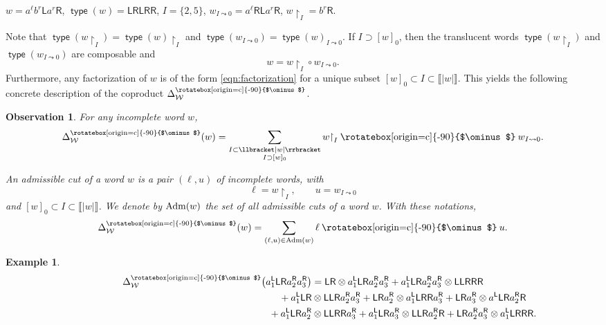 \documentclass[pdftex]{sigma}
\newcommand\overt{\mathbin{\text{\rotatebox[origin=c]{-90}{$\ominus$}}}}
\newcommand{\interval}[1]{\llbracket #1 \rrbracket}
\renewcommand{\restriction}[2]{{#1\mathbin{\upharpoonright}_{#2}}}
\newcommand{\translucidation}[2]{{{#1}_{#2\leadsto0}}}
\newcommand\IWc{\mathcal{W}}
\DeclareMathOperator{\Type}{\mathsf{type}}
\newcommand{\vcp}{\Delta^{\overt}}
\newcommand\vcpS{\vcp_{\IWc}}
\newcommand\LL{{\mathsf{L}}}
\newcommand\RR{{\mathsf{R}}}
\numberwithin{equation}{section}
\newtheorem{Observation}[Theorem]{Observation}
\newtheorem{Example}[Theorem]{Example}
\begin{document}
\begin{example*}
$ w = a^{\ell}b^{r}\LL a^{r} \RR$, $\Type(w)=\LL\RR\LL\RR\RR$, $I=\{2,5\}$, $\translucidation{w}{I}=a^{\ell}\RR\LL a^r\RR$, $\restriction{w}{I} = b^r\RR$.
\end{example*}

Note that $\Type(\restriction{w}{I})=\restriction{\Type(w)}{I}$ and $\Type(\translucidation{w}{I})=\translucidation{\Type(w)}{I}$. If $I\supset [w]_0$, then the translucent words $\Type(\restriction{w}{I})$ and $\Type(\translucidation{w}{I})$ are composable and
\begin{equation}
\label{eqn:factorization}
w=\restriction{w}{I}\circ\translucidation{w}{I}.
\end{equation}
Furthermore, any factorization of $w$ is of the form \eqref{eqn:factorization} for a unique subset $[w]_0\subset I\subset\interval{|w|}$. This yields the following concrete description of the coproduct $\vcpS$.

\begin{Observation} \label{obs:coproduct}
 For any incomplete word $w$,
 \[\vcpS(w)=\sum_{\substack{I \subset \interval{|w|} \\ I\supset{[w]_0}}}{\restriction{w}{I}}\overt{\translucidation{w}{I}}.\]

An {\it admissible cut} of a word $w$ is a pair $(\ell,u)$ of incomplete words, with
\[
\ell = \restriction{w}{I},\qquad u=\translucidation{w}{I}
\]
and $ [w]_{0} \subset I \subset \llbracket |w| \rrbracket$. We denote by ${\rm Adm}(w)$
the set of all admissible cuts of a word $w$. With these notations,
\[
\vcpS(w)=\sum_{(\ell,u) \in {\rm Adm}(w)} \ell \overt u.
\]
\end{Observation}

\begin{Example}
	\begin{gather*}
		\vcpS\big(a_1^{\LL}\LL\RR a_2^{\RR} a_3^{\RR}\big)
		 = \LL\RR \otimes a_1^{\LL} \LL\RR a_2^{\RR} a_3^{\RR}
		+a_1^{\LL}\LL\RR a_2^{\RR} a_3^{\RR}\otimes \LL\LL\RR\RR\RR\\
\hphantom{\vcpS\big(a_1^{\LL}\LL\RR a_2^{\RR} a_3^{\RR}\big)=}{}		 + a_1^{\LL}\LL\RR \otimes \LL\LL\RR a_2^{\RR} a_3^{\RR}
		+ \LL\RR a_2^{\RR}\otimes a_1^{\LL}\LL\RR\RR a_3^{\RR}
		+ \LL\RR a_3^{\RR}\otimes a^{\LL}\LL\RR a_2^{\RR}\RR\\
\hphantom{\vcpS\big(a_1^{\LL}\LL\RR a_2^{\RR} a_3^{\RR}\big)=}{} + a_1^{\LL}\LL\RR a_2^{\RR} \otimes \LL\LL\RR\RR a_3^{\RR}
		+ a_1^{\LL}\LL\RR a_3^{\RR}\otimes \LL\LL\RR a_2^{\RR}\RR
		+ \LL\RR a_2^{\RR} a_3^{\RR}\otimes a_1^{\LL}\LL\RR\RR\RR.
	\end{gather*}
\end{Example}
\end{document}
